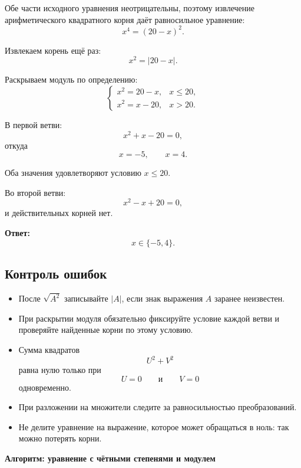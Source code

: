 \documentclass[a4paper,12pt]{article}
\newcommand{\key}[1]{\textcolor{darkaccent}{\textbf{#1}}}
\begin{document}
Обе части исходного уравнения неотрицательны, поэтому извлечение
арифметического квадратного корня даёт равносильное уравнение:
\[
x^4=(20-x)^2.
\]

Извлекаем корень ещё раз:
\[
x^2=|20-x|.
\]

Раскрываем модуль по определению:
\[
\begin{cases}
x^2=20-x, & x\le20,\\
x^2=x-20, & x>20.
\end{cases}
\]

В первой ветви:
\[
x^2+x-20=0,
\]
откуда
\[
x=-5,\qquad x=4.
\]

Оба значения удовлетворяют условию \(x\le20\).

Во второй ветви:
\[
x^2-x+20=0,
\]
и действительных корней нет.

\key{Ответ:}
\[
x\in\{-5,4\}.
\]

\subsection*{Контроль ошибок}

\begin{itemize}
  \item После \(\sqrt{A^2}\) записывайте \(|A|\), если знак выражения
  \(A\) заранее неизвестен.

  \item При раскрытии модуля обязательно фиксируйте условие каждой
  ветви и проверяйте найденные корни по этому условию.

  \item Сумма квадратов
  \[
  U^2+V^2
  \]
  равна нулю только при
  \[
  U=0
  \qquad\text{и}\qquad
  V=0
  \]
  одновременно.

  \item При разложении на множители следите за равносильностью
  преобразований.

  \item Не делите уравнение на выражение, которое может обращаться
  в ноль: так можно потерять корни.
\end{itemize}


\clearpage
\thispagestyle{fancy}

\begin{center}
{\Large\textcolor{darkaccent}{%
\textbf{Алгоритм: уравнение с чётными степенями и модулем}}}
\end{center}
\end{document}
